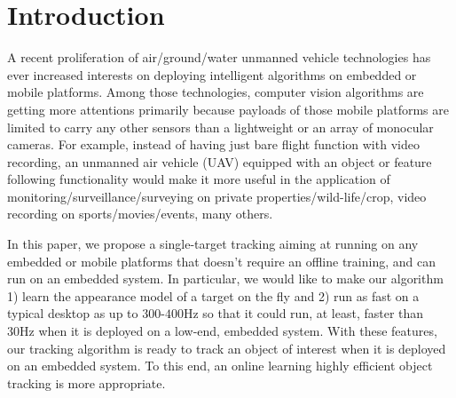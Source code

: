 \documentclass{bmvc2k}
\begin{document}
\section{Introduction}

A recent proliferation of air/ground/water unmanned vehicle
technologies has ever increased interests on deploying intelligent
algorithms on embedded or mobile platforms. Among those technologies,
computer vision algorithms are getting more attentions primarily
because payloads of those mobile platforms are limited to carry any
other sensors than a lightweight or an array of monocular cameras. For
example, instead of having just bare flight function with video
recording, an unmanned air vehicle (UAV) equipped with an object or
feature following functionality would make it more useful in the
application of monitoring/surveillance/surveying on private
properties/wild-life/crop, video recording on sports/movies/events,
many others.

In this paper, we propose a single-target tracking aiming at running
on any embedded or mobile platforms that doesn't require an offline
training, and can run on an embedded system. In particular, we would
like to make our algorithm 1) learn the appearance model of a target
on the fly and 2) run as fast on a typical desktop as up to
$300$-$400$Hz so that it could run, at least, faster than 30Hz when it
is deployed on a low-end, embedded system. With these features, our
tracking algorithm is ready to track an object of interest when it is
deployed on an embedded system. To this end, an online learning highly
efficient object tracking is more appropriate.
\end{document}
